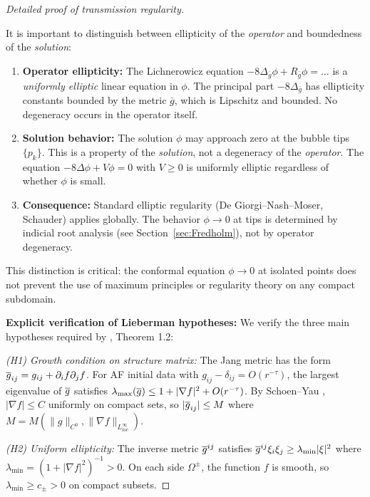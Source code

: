 \begin{proof}[Detailed proof of transmission regularity]
\begin{remark}\label{rem:EllipticityClarification}
It is important to distinguish between ellipticity of the \emph{operator} and boundedness of the \emph{solution}:
\begin{enumerate}
    \item \textbf{Operator ellipticity:} The Lichnerowicz equation $-8\Delta_{\bar{g}} \phi + R_{\bar{g}} \phi = \ldots$ is a \emph{uniformly elliptic} linear equation in $\phi$. The principal part $-8\Delta_{\bar{g}}$ has ellipticity constants bounded by the metric $\bar{g}$, which is Lipschitz and bounded. No degeneracy occurs in the operator itself.
    \item \textbf{Solution behavior:} The solution $\phi$ may approach zero at the bubble tips $\{p_k\}$. This is a property of the \emph{solution}, not a degeneracy of the \emph{operator}. The equation $-8\Delta\phi + V\phi = 0$ with $V \geq 0$ is uniformly elliptic regardless of whether $\phi$ is small.
    \item \textbf{Consequence:} Standard elliptic regularity (De Giorgi--Nash--Moser, Schauder) applies globally. The behavior $\phi \to 0$ at tips is determined by indicial root analysis (see Section~\ref{sec:Fredholm}), not by operator degeneracy.
\end{enumerate}
This distinction is critical: the conformal equation $\phi \to 0$ at isolated points does not prevent the use of maximum principles or regularity theory on any compact subdomain.
\end{remark}

\textbf{Explicit verification of Lieberman hypotheses:} We verify the three main hypotheses required by \cite{lieberman1988}, Theorem 1.2:

\textit{(H1) Growth condition on structure matrix:} The Jang metric has the form $\overline{g}_{ij} = g_{ij} + \partial_i f \partial_j f$. For AF initial data with $g_{ij} - \delta_{ij} = O(r^{-\tau})$, the largest eigenvalue of $\overline{g}$ satisfies $\lambda_{\max}(\overline{g}) \le 1 + |\nabla f|^2 + O(r^{-\tau})$. By Schoen--Yau \cite{schoenyau1981}, $|\nabla f| \le C$ uniformly on compact sets, so $|\overline{g}_{ij}| \le M$ where $M = M(\|g\|_{C^0}, \|\nabla f\|_{L^\infty_{loc}})$.

\textit{(H2) Uniform ellipticity:} The inverse metric $\overline{g}^{ij}$ satisfies $\overline{g}^{ij}\xi_i\xi_j \ge \lambda_{\min}|\xi|^2$ where $\lambda_{\min} = (1 + |\nabla f|^2)^{-1} > 0$. On each side $\Omega^\pm$, the function $f$ is smooth, so $\lambda_{\min} \ge c_\pm > 0$ on compact subsets.


\end{proof}
